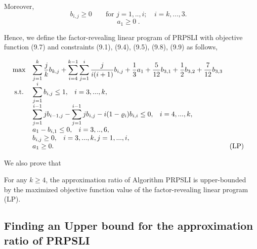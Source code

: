 \documentclass[runningheads,a4paper]{llncs}
\numberwithin{equation}{section}
\begin{document}
Moreover,
\begin{equation}
b_{i,j}\geq 0 \qquad
\textrm{for } j=1,..,i;\quad i=k,...,3.
\end{equation}
\begin{equation}
a_1\geq 0 \; .
\end{equation}

Hence, we define the factor-revealing linear program of PRPSLI with objective function (9.7) and constraints (9.1), (9.4), (9.5), (9.8), (9.9) as follows,

\[\begin{array}{cll} \max &{\displaystyle \sum_{j=1}^k \frac{j}{k}b_{k,j}+\sum_{i=4}^{k-1}\sum_{j=1}^i \frac{j}{i(i+1)}b_{i,j}+\frac{1}{3}a_1+\frac{5}{12}b_{3,1}+\frac{1}{2}b_{3,2}+\frac{7}{12}b_{3,3}} \\
{\rm s.t.} &{\displaystyle \sum_{j=1}^i b_{i,j}\leq 1,} \quad i=3,...,k,\\
&{\displaystyle \sum_{j=1}^{i-1} jb_{i-1,j}-\sum_{j=1}^{i-1}jb_{i,j}-i(1-\varrho_i) b_{i,i} \leq 0,} \quad i=4,...,k, \\
&{\displaystyle a_1-b_{i,1} \leq 0,} \quad i=3,..,6, \\
&{\displaystyle b_{i,j} \geq 0,} \quad i=3,...,k, j=1,...,i, \\
& a_1 \geq 0. & \textrm{(LP)} \\
\end{array} \]

We also prove that

\begin{lemma}
For any $k\geq 4$, the approximation ratio of Algorithm PRPSLI is upper-bounded by the maximized objective function value of the factor-revealing linear program (LP).
\end{lemma}


\subsection{Finding an Upper bound for the approximation ratio of PRPSLI}
\end{document}
